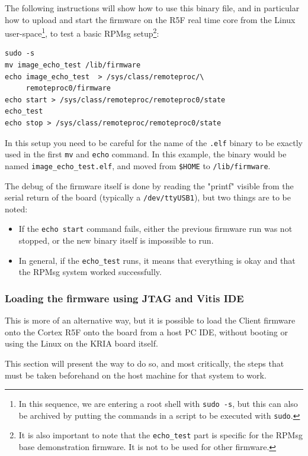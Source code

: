 \documentclass[10pt]{article}
\begin{document}
The following instructions will show how to use this binary file, and
in particular how to upload and start the firmware on the R5F real time core
from the Linux user-space\footnote{In this sequence, we are entering a root shell with \texttt{sudo -s}, but this can
also be archived by putting the commands in a script to be executed with \texttt{sudo}.}, to test a basic RPMsg setup\footnote{It is also important to note that the \texttt{echo\_test} part is specific for the
RPMsg base demonstration firmware. It is not to be used for other firmware.}:
\begin{verbatim}
sudo -s
mv image_echo_test /lib/firmware
echo image_echo_test  > /sys/class/remoteproc/\
     remoteproc0/firmware
echo start > /sys/class/remoteproc/remoteproc0/state
echo_test
echo stop > /sys/class/remoteproc/remoteproc0/state
\end{verbatim}

In this setup you need to be careful for the name of the \texttt{.elf} binary to be exactly used
in the first \texttt{mv} and \texttt{echo} command. In this example, the binary would be named
\texttt{image\_echo\_test.elf}, and moved from \texttt{\$HOME} to \texttt{/lib/firmware}.

The debug of the firmware itself is done by reading the "printf" visible from the serial
return of the board (typically a \texttt{/dev/ttyUSB1}), but two things are to be noted:
\begin{itemize}
\item If the \texttt{echo start} command fails, either the previous firmware run was not stopped,
or the new binary itself is impossible to run.
\item In general, if the \texttt{echo\_test} runs, it means that everything is okay and that
the RPMsg system worked successfully.
\end{itemize}

\clearpage
\subsubsection{Loading the firmware using JTAG and Vitis IDE}
\label{sec:org8b5f3b9}
This is more of an alternative way, but it is possible to load the Client
firmware onto the Cortex R5F onto the board from a host PC IDE, without booting or
using the Linux on the KRIA board itself.

This section will present the way to do so, and most critically, the steps that must
be taken beforehand on the host machine for that system to work.
\end{document}
